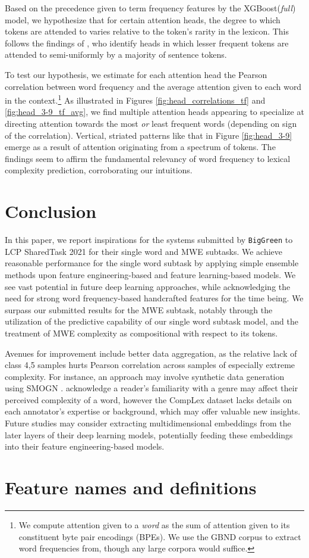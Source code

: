 \documentclass[11pt,a4paper]{article}
\begin{document}
Based on the precedence given to term frequency features by the XGBoost(\textit{full}) model, we hypothesize that for certain attention heads, the degree to which tokens are attended to varies relative to the token's rarity in the lexicon. This follows the findings of \citealp{1905-09418}, who identify heads in which lesser frequent tokens are attended to semi-uniformly by a majority of sentence tokens. 

To test our hypothesis, we estimate for each attention head the Pearson correlation between word frequency and the average attention given to each word in the context.\footnote{We compute attention given to a \textit{word} as the sum of attention given to its constituent byte pair encodings (BPEs). We use the GBND corpus to extract word frequencies from, though any large corpora would suffice.} As illustrated in Figures \ref{fig:head_correlations_tf} and \ref{fig:head_3-9_tf_avg}, we find multiple attention heads appearing to specialize at directing attention towards the most \textit{or} least frequent words (depending on sign of the correlation). Vertical, striated patterns like that in Figure \ref{fig:head_3-9} emerge as a result of attention originating from a spectrum of tokens. The findings seem to affirm the fundamental relevancy of word frequency to lexical complexity prediction, corroborating our intuitions.

\section{Conclusion}

In this paper, we report inspirations for the systems submitted by \texttt{BigGreen} to LCP SharedTask 2021 for their single word and MWE subtasks. We achieve  reasonable performance for the single word subtask by applying simple ensemble methods upon feature engineering-based and feature learning-based models. We see vast potential in future deep learning approaches, while acknowledging the need for strong word frequency-based handcrafted features for the time being. We surpass our submitted results for the MWE subtask, notably through the utilization of the predictive capability of our single word subtask model, and the treatment of MWE complexity as compositional with respect to its tokens.

Avenues for improvement include better data aggregation, as the relative lack of class 4,5 samples hurts Pearson correlation across samples of especially extreme complexity. For instance, an approach may involve synthetic data generation using SMOGN \citep{pmlr-v74-branco17a}. \citet{shardlow2020complex} acknowledge a reader's familiarity with a genre may affect their perceived complexity of a word, however the CompLex dataset lacks details on each annotator's expertise or background, which may offer valuable new insights. Future studies may consider extracting multidimensional embeddings from the later layers of their deep learning models, potentially feeding these embeddings into their feature engineering-based models.




\appendix
\section{Feature names and definitions}
\end{document}
